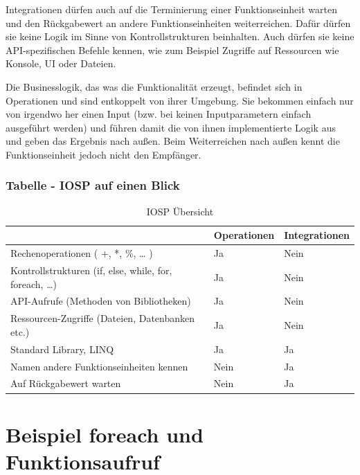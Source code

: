 \begin{enumerate}
Integrationen dürfen auch auf die Terminierung einer Funktionseinheit warten und den Rückgabewert an andere Funktionseinheiten weiterreichen.
Dafür dürfen sie keine Logik im Sinne von Kontrollstrukturen beinhalten.
Auch dürfen sie keine API-spezifischen Befehle kennen, wie zum Beispiel Zugriffe
auf Ressourcen wie Konsole, UI oder Dateien.

Die Businesslogik, das was die Funktionalität erzeugt, befindet sich in Operationen und sind entkoppelt von ihrer Umgebung.
Sie bekommen einfach nur von irgendwo her einen Input (bzw. bei keinen Inputparametern einfach ausgeführt werden) und führen damit die von ihnen implementierte
Logik aus und geben das Ergebnis nach außen. Beim Weiterreichen nach außen kennt die Funktionseinheit jedoch nicht den Empfänger.
\end{enumerate}

\subsubsection{Tabelle -  IOSP auf einen Blick}


\bigskip
\begin{table}[H]
	\centering
\begin{tabularx}{\textwidth}{|X|l|l|}
	\hline
 & Operationen & Integrationen\\
\hline
Rechenoperationen ( +, *, \%, \ldots{} ) & Ja & Nein\\ \hline
Kontrollstrukturen (if, else, while, for, foreach, \ldots{}) & Ja & Nein\\ \hline
API-Aufrufe (Methoden von Bibliotheken) & Ja & Nein\\ \hline
Ressourcen-Zugriffe (Dateien, Datenbanken etc.) & Ja & Nein\\ \hline
Standard Library, LINQ & Ja & Ja\\ \hline
Namen andere Funktionseinheiten kennen & Nein & Ja\\ \hline
Auf Rückgabewert warten & Nein & Ja\\ \hline
\end{tabularx}
	\medskip
	\caption{IOSP Übersicht}
\end{table}



\section{Beispiel foreach und Funktionsaufruf}




